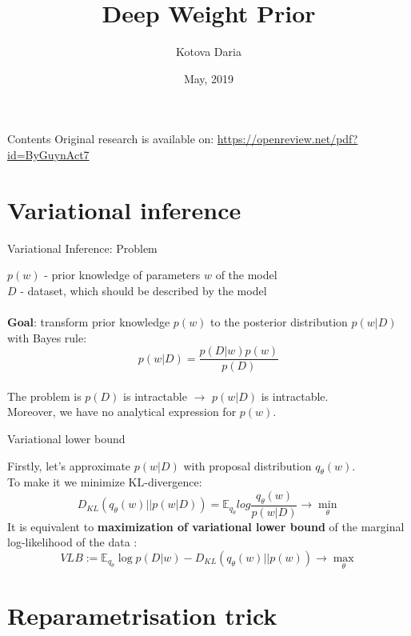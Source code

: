 \documentclass[19pt]{beamer}
\title{Deep Weight Prior}
\author{Kotova Daria}
\institute[MIPT] %
\date{May, 2019}
\begin{document}
\begin{frame}
  \titlepage
\end{frame}

\begin{frame}{Contents}
    Original research is available on: 
    \url{https://openreview.net/pdf?id=ByGuynAct7}
  \tableofcontents
\end{frame}

\section{Variational inference}

\begin{frame}{Variational Inference: Problem}

$p(w)$ - prior knowledge of parameters $w$ of the model\\
$D$ - dataset, which should be described by the model\\
\\
\textbf{Goal}: transform prior knowledge $p(w)$ to the posterior distribution $p(w \vert D)$ with Bayes rule:\\
$$
p(w \vert D) = \frac{p(D \vert w) p(w)}{p(D)}
$$\\
The problem is $p(D)$ is intractable $\rightarrow$ $p(w \vert D)$ is intractable. \\
Moreover, we have no analytical expression for $p(w)$.\\

\end{frame}

\begin{frame}{Variational lower bound}

Firstly, let's approximate $p(w \vert D)$ with proposal distribution $q_{\theta}(w)$. \\
To make it we minimize KL-divergence:\\
$$
D_{KL}(q_{\theta}(w) \vert \vert p(w \vert D)) = \mathbb{E}_{q_{\theta}}log\frac{q_{\theta}(w)}{p(w \vert  D)} \rightarrow \min_{\theta}
$$ 
It is equivalent to \textbf{maximization of variational lower bound} of the marginal log-likelihood of the
data :
$$
VLB := \mathbb{E}_{q_{\theta}} \log p(D \vert w) - D_{KL}(q_{\theta}(w) \vert \vert p(w)) \rightarrow \max_{\theta}
$$
\end{frame}

\section{Reparametrisation trick}
\end{document}
